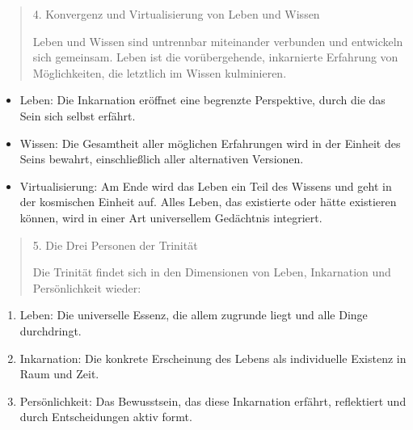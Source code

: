 \documentclass[
  ngerman,
]{article}
\begin{document}
\begin{quote}
4. Konvergenz und Virtualisierung von Leben und Wissen

Leben und Wissen sind untrennbar miteinander verbunden und entwickeln
sich gemeinsam. Leben ist die vorübergehende, inkarnierte Erfahrung von
Möglichkeiten, die letztlich im Wissen kulminieren.
\end{quote}

\begin{itemize}
\item
  Leben: Die Inkarnation eröffnet eine begrenzte Perspektive, durch die
  das Sein sich selbst erfährt.
\item
  Wissen: Die Gesamtheit aller möglichen Erfahrungen wird in der Einheit
  des Seins bewahrt, einschließlich aller alternativen Versionen.
\item
  Virtualisierung: Am Ende wird das Leben ein Teil des Wissens und geht
  in der kosmischen Einheit auf. Alles Leben, das existierte oder hätte
  existieren können, wird in einer Art universellem Gedächtnis
  integriert.
\end{itemize}

\begin{quote}
5. Die Drei Personen der Trinität

Die Trinität findet sich in den Dimensionen von Leben, Inkarnation und
Persönlichkeit wieder:
\end{quote}

\begin{enumerate}
\def\labelenumi{\arabic{enumi}.}
\item
  Leben: Die universelle Essenz, die allem zugrunde liegt und alle Dinge
  durchdringt.
\item
  Inkarnation: Die konkrete Erscheinung des Lebens als individuelle
  Existenz in Raum und Zeit.
\item
  Persönlichkeit: Das Bewusstsein, das diese Inkarnation erfährt,
  reflektiert und durch Entscheidungen aktiv formt.
\end{enumerate}
\end{document}

